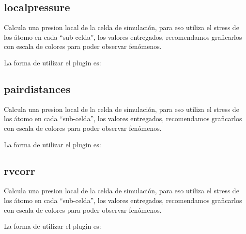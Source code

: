 \subsection{localpressure}

Calcula una presion local de la celda de simulaci\'on, para eso utiliza el
stress de los \'atomo en cada ``sub-celda'', los valores entregados,
recomendamos graficarlos con escala de colores para poder observar fen\'omenos. 

La forma de utilizar el plugin es:

\subsection{pairdistances}

Calcula una presion local de la celda de simulaci\'on, para eso utiliza el
stress de los \'atomo en cada ``sub-celda'', los valores entregados,
recomendamos graficarlos con escala de colores para poder observar fen\'omenos. 

La forma de utilizar el plugin es:

\subsection{rvcorr}

Calcula una presion local de la celda de simulaci\'on, para eso utiliza el
stress de los \'atomo en cada ``sub-celda'', los valores entregados,
recomendamos graficarlos con escala de colores para poder observar fen\'omenos. 

La forma de utilizar el plugin es:

